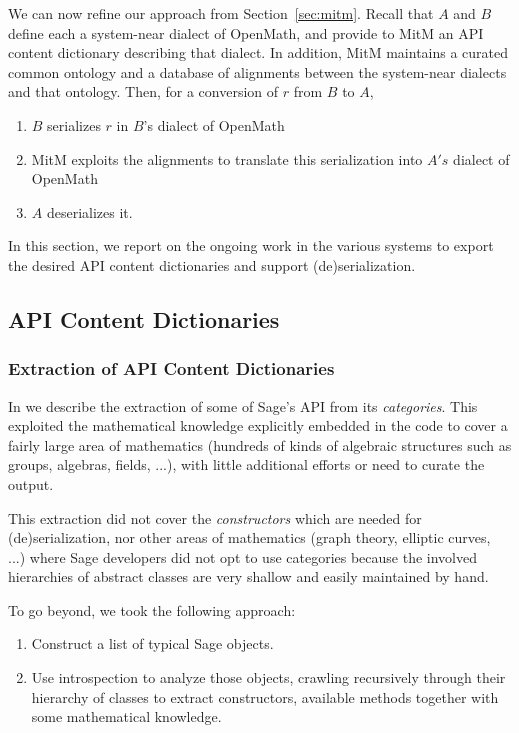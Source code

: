We can now refine our approach from Section~\ref{sec:mitm}. Recall
that $A$ and $B$ define each a system-near dialect of OpenMath, and
provide to MitM an API content dictionary describing that dialect. In
addition, MitM maintains a curated common ontology and a database of
alignments between the system-near dialects and that ontology. Then,
for a conversion of $r$ from $B$ to $A$,
\begin{enumerate}
\item $B$ serializes $r$ in $B$'s dialect of OpenMath
\item MitM exploits the alignments to translate this serialization
  into $A's$ dialect of OpenMath
\item $A$ deserializes it.
\end{enumerate}

In this section, we report on the ongoing work in the various systems
to export the desired API content dictionaries and support
(de)serialization.

\subsection{\Sage API Content Dictionaries}

\subsubsection{Extraction of \Sage API Content Dictionaries}

In \cite{DehKohKon:iop16} we describe the extraction of some of Sage's
API from its \emph{categories}. This exploited the mathematical
knowledge explicitly embedded in the code to cover a fairly large area
of mathematics (hundreds of kinds of algebraic structures such as
groups, algebras, fields, ...), with little additional efforts or need
to curate the output.

This extraction did not cover the \emph{constructors} which are needed
for (de)serialization, nor other areas of mathematics (graph theory,
elliptic curves, ...) where Sage developers did not opt to use
categories because the involved hierarchies of abstract classes are
very shallow and easily maintained by hand.

To go beyond, we took the following approach:
\begin{enumerate}
\item Construct a list of typical Sage objects.
\item Use introspection to analyze those objects, crawling recursively
  through their hierarchy of classes to extract constructors,
  available methods together with some mathematical knowledge.
\end{enumerate}

